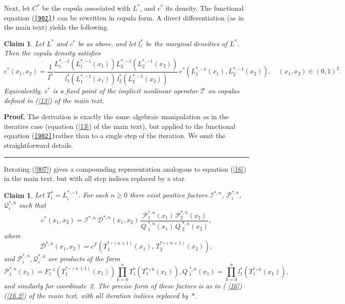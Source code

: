 \documentclass[onecolumn]{article}
\newtheorem{claim}[theorem]{Claim}
\newenvironment{proof}[1][Proof]{\noindent\textbf{#1.} }{\ \rule{0.5em}{0.5em}}
\begin{document}
Next, let $C^{\ast }$ be the copula associated with $L^{\ast }$, and $%
c^{\ast }$ its density. The functional equation (\texttt{\textup{\ref{902})}}%
can be rewritten in copula form. A direct differentiation (as in the main
text) yields the following.

\begin{claim}
\label{copula-FP} Let $L^{\ast }$ and $c^{\ast }$ be as above, and let $%
l_{i}^{\ast }$ be the marginal densities of $L^{\ast }$. Then the copula
density satisfies 
\begin{equation}
c^{\ast }(x_{1},x_{2})=\frac{1}{I^{\ast }}\frac{L_{1}^{\ast ,-1}(L_{1}^{\ast
,-1}(x_{1}))L_{2}^{\ast ,-1}(L_{2}^{\ast ,-1}(x_{2}))}{\,l_{1}^{\ast
}(L_{1}^{\ast ,-1}(x_{1}))\,l_{2}^{\ast }(L_{2}^{\ast ,-1}(x_{2}))}\,c^{\ast
}(L_{1}^{\ast ,-1}(x_{1}),L_{2}^{\ast ,-1}(x_{2})),\quad (x_{1},x_{2})\in
(0,1)^{2}.  \label{907}
\end{equation}%
Equivalently, $c^{\ast }$ is a fixed point of the implicit nonlinear
operator $\mathcal{T}$ on copulas defined in (\ref{13}) of the main
text.\hfill
\end{claim}

\begin{proof}
The derivation is exactly the same algebraic manipulation as in the
iterative case (equation (\ref{13}) of the main text), but applied to the
functional equation (\texttt{\textup{\ref{902})}}rather than to a single
step of the iteration. We omit the straightforward details.
\end{proof}

Iterating (\ref{907}) gives a compounding representation analogous to
equation (\ref{16}) in the main text, but with all step indices replaced by
a star.

\begin{claim}
\label{star-compounding} Let $T_{i}^{\ast }=L_{i}^{\ast ,-1}$. For each $%
n\geq 0$ there exist positive factors $\mathcal{I}^{\ast ,n}$, $\mathcal{P}%
_{i}^{\ast ,n}$, $\mathcal{Q}_{i}^{\ast ,n}$ such that 
\begin{equation}
c^{\ast }(x_{1},x_{2})=\mathcal{I}^{\ast ,n}\,\mathcal{D}^{\ast
,n}(x_{1},x_{2})\,\frac{\mathcal{P}_{1}^{\ast ,n}(x_{1})\,\mathcal{P}%
_{2}^{\ast ,n}(x_{2})}{Q\mathcal{\ }_{1}^{\ast ,n}(x_{1})\,Q\mathcal{\ }%
_{2}^{\ast ,n}(x_{2})},  \label{908}
\end{equation}%
where 
\begin{equation}
\mathcal{D}^{\ast ,n}(x_{1},x_{2})=c^{F}(T_{1}^{\ast \circ
(n+1)}(x_{1}),\,T_{2}^{\ast \circ (n+1)}(x_{2})),  \label{909}
\end{equation}%
and $\mathcal{P}_{i}^{\ast ,n},\mathcal{Q}_{i}^{\ast ,n}$ are products of
the form 
\begin{equation}
\mathcal{P}_{1}^{\ast ,n}(x_{1})=F_{1}^{-1}(T_{1}^{\ast \circ
(n+1)}(x_{1}))\prod_{k=0}^{n}T_{1}^{\ast }(T_{1}^{\ast \circ k}(x_{1})),Q%
\mathcal{\ }_{1}^{\ast ,n}(x_{1})=\prod_{k=0}^{n}l_{1}^{\ast }(T_{1}^{\ast
\circ k}(x_{1})),  \label{910}
\end{equation}%
and similarly for coordinate~2. The precise form of these factors is as in (%
\ref{16})--(\ref{16.2}) of the main text, with all iteration indices
replaced by~$\ast $.
\end{claim}
\end{document}
